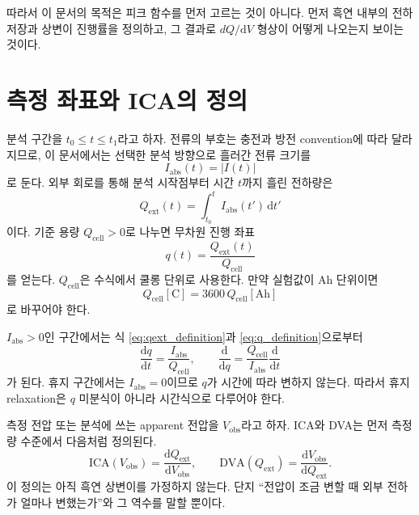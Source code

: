 \documentclass[11pt,a4paper]{article}
\newcommand{\dd}{\mathrm{d}}
\newcommand{\ext}{\mathrm{ext}}
\newcommand{\cell}{\mathrm{cell}}
\newcommand{\obs}{\mathrm{obs}}
\newcommand{\absI}{I_{\mathrm{abs}}}
\begin{document}
따라서 이 문서의 목적은 피크 함수를 먼저 고르는 것이 아니다. 먼저 흑연 내부의 전하 저장과 상변이 진행률을 정의하고, 그 결과로 \(dQ/\dd V\) 형상이 어떻게 나오는지 보이는 것이다.

\section{측정 좌표와 ICA의 정의}

분석 구간을 \(t_0\le t\le t_1\)라고 하자. 전류의 부호는 충전과 방전 convention에 따라 달라지므로, 이 문서에서는 선택한 분석 방향으로 흘러간 전류 크기를
\begin{equation}
\absI(t)=|I(t)|
\label{eq:current_magnitude}
\end{equation}
로 둔다. 외부 회로를 통해 분석 시작점부터 시간 \(t\)까지 흘린 전하량은
\begin{equation}
Q_{\ext}(t)=\int_{t_0}^{t}\absI(t')\,\dd t'
\label{eq:qext_definition}
\end{equation}
이다. 기준 용량 \(Q_{\cell}>0\)로 나누면 무차원 진행 좌표
\begin{equation}
q(t)=\frac{Q_{\ext}(t)}{Q_{\cell}}
\label{eq:q_definition}
\end{equation}
를 얻는다. \(Q_{\cell}\)은 수식에서 쿨롱 단위로 사용한다. 만약 실험값이 Ah 단위이면
\begin{equation}
Q_{\cell}[\mathrm{C}]=3600\,Q_{\cell}[\mathrm{Ah}]
\label{eq:ah_to_c}
\end{equation}
로 바꾸어야 한다.

\(\absI>0\)인 구간에서는 식 \eqref{eq:qext_definition}과 \eqref{eq:q_definition}으로부터
\begin{equation}
\frac{\dd q}{\dd t}=\frac{\absI}{Q_{\cell}},
\qquad
\frac{\dd}{\dd q}=\frac{Q_{\cell}}{\absI}\frac{\dd}{\dd t}
\label{eq:time_to_q}
\end{equation}
가 된다. 휴지 구간에서는 \(\absI=0\)이므로 \(q\)가 시간에 따라 변하지 않는다. 따라서 휴지 relaxation은 \(q\) 미분식이 아니라 시간식으로 다루어야 한다.

측정 전압 또는 분석에 쓰는 apparent 전압을 \(V_{\obs}\)라고 하자. ICA와 DVA는 먼저 측정량 수준에서 다음처럼 정의된다.
\begin{equation}
\mathrm{ICA}(V_{\obs})
=
\frac{\dd Q_{\ext}}{\dd V_{\obs}},
\qquad
\mathrm{DVA}(Q_{\ext})
=
\frac{\dd V_{\obs}}{\dd Q_{\ext}}.
\label{eq:ica_dva_measurement}
\end{equation}
이 정의는 아직 흑연 상변이를 가정하지 않는다. 단지 ``전압이 조금 변할 때 외부 전하가 얼마나 변했는가''와 그 역수를 말할 뿐이다.
\end{document}
